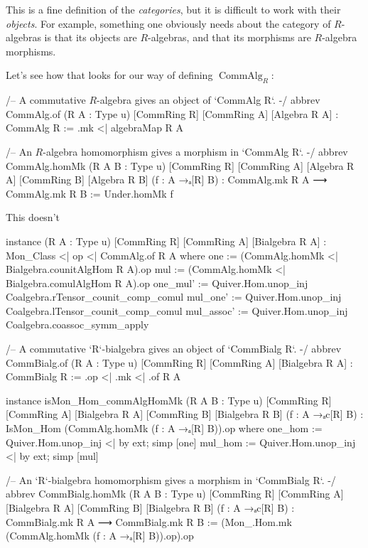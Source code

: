 \documentclass{article}
\DeclareMathOperator{\CommAlg}{CommAlg}
\begin{document}
This is a fine definition of the \emph{categories}, but it is difficult to work with their \emph{objects}. For example, something one obviously needs about the category of $R$-algebras is that its objects are $R$-algebras, and that its morphisms are $R$-algebra morphisms.

Let's see how that looks for our way of defining $\CommAlg_R$:
\begin{leancode}
  /-- A commutative $R$-algebra gives an object of `CommAlg R`. -/
  abbrev CommAlg.of (R A : Type u) [CommRing R] [CommRing A] [Algebra R A] : CommAlg R :=
    .mk <| algebraMap R A

  /-- An $R$-algebra homomorphism gives a morphism in `CommAlg R`. -/
  abbrev CommAlg.homMk (R A B : Type u) [CommRing R] [CommRing A] [Algebra R A]
      [CommRing B] [Algebra R B] (f : A →ₐ[R] B) : CommAlg.mk R A ⟶ CommAlg.mk R B :=
    Under.homMk f
\end{leancode}

This doesn't

\begin{leancode}
  instance (R A : Type u) [CommRing R] [CommRing A] [Bialgebra R A] :
      Mon_Class <| op <| CommAlg.of R A where
    one := (CommAlg.homMk <| Bialgebra.counitAlgHom R A).op
    mul := (CommAlg.homMk <| Bialgebra.comulAlgHom R A).op
    one_mul' := Quiver.Hom.unop_inj Coalgebra.rTensor_counit_comp_comul
    mul_one' := Quiver.Hom.unop_inj Coalgebra.lTensor_counit_comp_comul
    mul_assoc' := Quiver.Hom.unop_inj Coalgebra.coassoc_symm_apply

  /-- A commutative `R`-bialgebra gives an object of `CommBialg R`. -/
  abbrev CommBialg.of (R A : Type u) [CommRing R] [CommRing A] [Bialgebra R A] : CommBialg R :=
    .op <| .mk <| .of R A

  instance isMon_Hom_commAlgHomMk (R A B : Type u) [CommRing R] [CommRing A] [Bialgebra R A]
      [CommRing B] [Bialgebra R B] (f : A →ₐc[R] B) :
      IsMon_Hom (CommAlg.homMk (f : A →ₐ[R] B)).op where
    one_hom := Quiver.Hom.unop_inj <| by ext; simp [one]
    mul_hom := Quiver.Hom.unop_inj <| by ext; simp [mul]

  /-- An `R`-bialgebra homomorphism gives a morphism in `CommBialg R`. -/
  abbrev CommBialg.homMk (R A B : Type u) [CommRing R] [CommRing A] [Bialgebra R A]
      [CommRing B] [Bialgebra R B] (f : A →ₐc[R] B) : CommBialg.mk R A ⟶ CommBialg.mk R B :=
    (Mon_.Hom.mk (CommAlg.homMk (f : A →ₐ[R] B)).op).op
\end{leancode}
\end{document}
